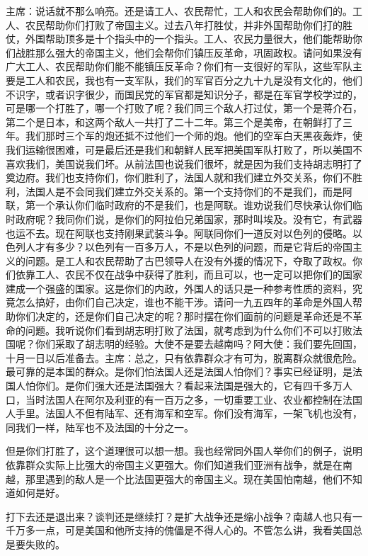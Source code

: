 主席：说话就不那么响亮。还是请工人、农民帮忙，工人和农民会帮助你们的。工人、农民帮助你们打败了帝国主义。过去八年打胜仗，并非外国帮助你们打的胜仗，外国帮助顶多是十个指头中的一个指头。工人、农民力量很大，他们能帮助你们战胜那么强大的帝国主义，他们会帮你们镇压反革命，巩固政权。请问如果没有广大工人、农民帮助你们能不能镇压反革命？你们有一支很好的军队，这些军队主要是工人和农民，我也有一支军队，我们的军官百分之九十九是没有文化的，他们不识字，或者识字很少，而国民党的军官都是知识分子，都是在军官学校学过的，可是哪一个打胜了，哪一个打败了呢？我们同三个敌人打过仗，第一个是蒋介石，第二个是日本，和这两个敌人一共打了二十二年。第三个是美帝，在朝鲜打了三年。我们那时三个军的炮还抵不过他们一个师的炮。他们的空军白天黑夜轰炸，使我们运输很困难，可是最后还是我们和朝鲜人民军把美国军队打败了，所以美国不喜欢我们，美国说我们坏。从前法国也说我们很坏，就是因为我们支持胡志明打了奠边府。我们也支持你们，你们胜利了，法国人就和我们建立外交关系，你们不胜利，法国人是不会同我们建立外交关系的。第一个支持你们的不是我们，而是阿联，第一个承认你们临时政府的不是我们，也是阿联。谁劝说我们尽快承认你们临时政府呢？我同你们说，是你们的阿拉伯兄弟国家，那时叫埃及。没有它，有武器也运不去。现在阿联也支持刚果武装斗争。阿联同你们一道反对以色列的侵略。以色列人才有多少？以色列有一百多万人，不是以色列的问题，而是它背后的帝国主义的问题。是工人和农民帮助了古巴领导人在没有外援的情况下，夺取了政权。你们依靠工人、农民不仅在战争中获得了胜利，而且可以，也一定可以把你们的国家建成一个强盛的国家。这是你们的内政，外国人的话只是一种参考性质的资料，究竟怎么搞好，由你们自己决定，谁也不能干涉。请问一九五四年的革命是外国人帮助你们决定的，还是你们自己决定的呢？那时摆在你们面前的问题是革命还是不革命的问题。我听说你们看到胡志明打败了法国，就考虑到为什么你们不可以打败法国呢？你们采取了胡志明的经验。大使不是要去越南吗？阿大使：我们要先回国，十月一日以后准备去。主席：总之，只有依靠群众才有可为，脱离群众就很危险。最可靠的是本国的群众。是你们怕法国人还是法国人怕你们？事实已经证明，是法国人怕你们。是你们强大还是法国强大？看起来法国是强大的，它有四千多万人口，当时法国人在阿尔及利亚的有一百万之多，一切重要工业、农业都控制在法国人手里。法国人不但有陆军、还有海军和空军。你们没有海军，一架飞机也没有，同我们一样，陆军也不及法国的十分之一。

但是你们打胜了，这个道理很可以想一想。我也经常同外国人举你们的例子，说明依靠群众实际上比强大的帝国主义更强大。你们知道我们亚洲有战争，就是在南越，那里遇到的敌人是一个比法国更强大的帝国主义。现在美国怕南越，他们不知道如何是好。

打下去还是退出来？谈判还是继续打？是扩大战争还是缩小战争？南越人也只有一千万多一点，可是美国和他所支持的傀儡是不得人心的。不管怎么讲，我看美国总是要失败的。

